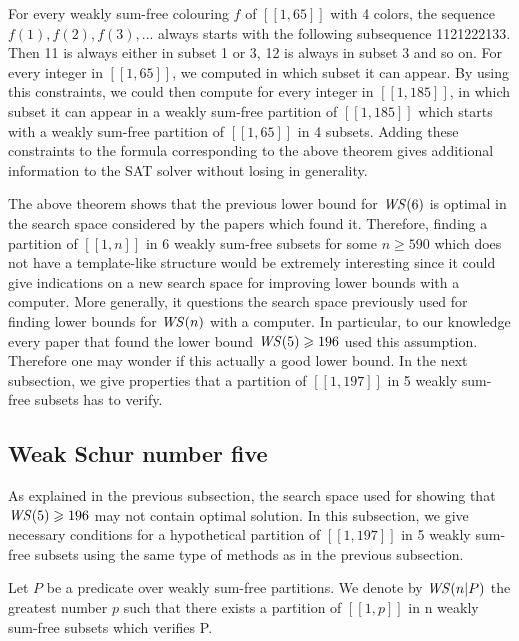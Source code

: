 \par
For every weakly sum-free colouring \(f\) of \([\![1,65]\!]\) with 4 colors, the sequence \(f(1), f(2), f(3), ...\) always
starts with the following subsequence 1121222133. Then 11 is always
either in subset 1 or 3, 12 is always in subset 3 and so on. For every integer in \([\![1,65]\!]\), we computed in which
subset it can appear.
By using this constraints, we could then compute for every integer in \([\![1,185]\!]\), in which subset it can appear
in a weakly sum-free
partition of \([\![1,185]\!]\) which starts with a weakly sum-free partition of \([\![1,65]\!]\) in 4 subsets. Adding
these constraints to the
formula corresponding to the above theorem gives additional information to the SAT solver without losing in generality.

\par
The above theorem shows that the previous lower bound for \(\mathit{WS} (6)\) is optimal in the search space considered by the
papers which found it.
Therefore, finding a partition of \([\![1,n]\!]\) in 6 weakly sum-free subsets for some \(n \geqslant 590\) which does
not have a template-like structure
would be extremely interesting since it could give indications on a new search space for improving lower bounds with a
computer. More generally,
it questions the search space previously used for finding lower bounds for \(\mathit{WS} (n)\) with a computer. In particular, to
our knowledge every paper
that found the lower bound \(\mathit{WS} (5) \geqslant 196\) used this assumption. Therefore one may wonder
if this actually a good lower
bound. In the next subsection, we give properties that a partition of \([\![1,197]\!]\) in 5 weakly sum-free subsets has
to verify.


\subsection{Weak Schur number five}
As explained in the previous subsection, the search space used for showing that \(\mathit{WS} (5) \geqslant 196\) may not contain
optimal solution. In this subsection,
we give necessary conditions for a hypothetical partition of \([\![1,197]\!]\) in 5 weakly sum-free subsets using the
same type of methods as in the
previous subsection.

\begin{notation}
Let \(P\) be a predicate over weakly sum-free partitions. We denote by \(\mathit{WS} (n | P)\) the greatest number \(p\) such that
there exists a partition of
\([\![1,p]\!]\) in n weakly sum-free subsets which verifies P.
\end{notation}

